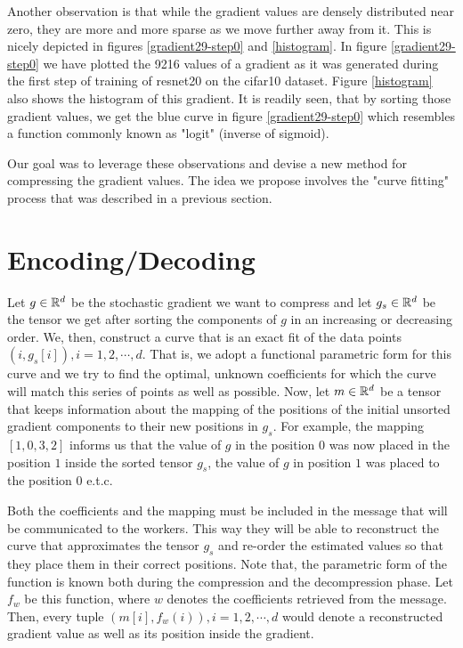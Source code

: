     Another observation is that while the gradient values are densely distributed near zero, they are more and more sparse as we move further away from it.
    This is nicely depicted in figures \ref{gradient29-step0} and \ref{histogram}.
    In figure \ref{gradient29-step0} we have plotted the 9216 values of a gradient as it was generated during the first step of training of resnet20 on the cifar10 dataset.
    Figure \ref{histogram} also shows the histogram of this gradient. 
    It is readily seen, that by sorting those gradient values, we get the blue curve in figure \ref{gradient29-step0} which resembles a function commonly known as "logit" (inverse of sigmoid).
    
    Our goal was to leverage these observations and devise a new method for compressing the gradient values. 
    The idea we propose involves the "curve fitting" process that was described in a previous section.
    
    \section{Encoding/Decoding}

    Let $g\in\mathbb{R}^d$ be the stochastic gradient we want to compress
    and let $g_s\in\mathbb{R}^d$ be the tensor we get after sorting the components of $g$ in an increasing or decreasing order.
    We, then, construct a curve that is an exact fit of the data points $(i, g_s[i]), i=1,2,\cdots,d$.
    That is, we adopt a functional parametric form for this curve and we try to find the optimal, unknown coefficients for which the curve will match this series of points as well as possible. Now, let $m\in\mathbb{R}^d$ be a tensor that keeps information about the mapping of the positions of the initial unsorted gradient components to their new positions in $g_s$.
    For example, the mapping $[1,0,3,2]$ informs us that the value of $g$ in the position $0$ was now placed in the position $1$ inside the sorted tensor $g_s$, the value of $g$ in position $1$ was placed to the position $0$ e.t.c.
    
    Both the coefficients and the mapping must be included in the message that will be communicated to the workers. This way they will be able to reconstruct the curve that approximates the tensor $g_s$ and re-order the estimated values so that they place them in their correct positions. Note that, the parametric form of the function is known both during the compression and the decompression phase.
    Let $f_w$ be this function, where $w$ denotes the coefficients retrieved from the message. 
    Then, every tuple $(m[i], f_w(i)), i=1,2,\cdots,d$ would denote a reconstructed gradient value as well as its position inside the gradient.
    
